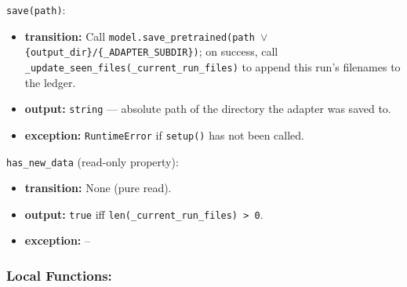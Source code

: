 \documentclass[12pt, titlepage]{article}
\begin{document}
\noindent\texttt{save(path)}:
\begin{itemize}
  \item \textbf{transition:} Call \texttt{model.save\_pretrained(path $\vee$ \{output\_dir\}/\{\_ADAPTER\_SUBDIR\})}; on success, call \texttt{\_update\_seen\_files(\_current\_run\_files)} to append this run's filenames to the ledger.
  \item \textbf{output:} \texttt{string} — absolute path of the directory the adapter was saved to.
  \item \textbf{exception:} \texttt{RuntimeError} if \texttt{setup()} has not been called.
\end{itemize}

\noindent\texttt{has\_new\_data} (read-only property):
\begin{itemize}
  \item \textbf{transition:} None (pure read).
  \item \textbf{output:} \texttt{true} iff \texttt{len(\_current\_run\_files) > 0}.
  \item \textbf{exception:} --
\end{itemize}

\subsubsection{Local Functions:}
\end{document}
